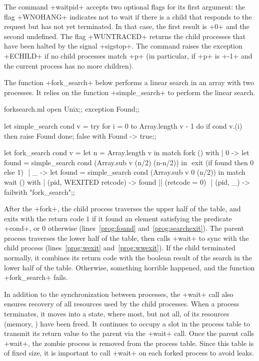 The command \ml+waitpid+ accepts two optional flags for its first
argument: the flag \ml+WNOHANG+ indicates not to wait if there is
a child that responds to the request but has not yet terminated.
In that case, the first result is \ml+0+ and the second undefined.
The flag \ml+WUNTRACED+ returns the child processes that have been
halted by the signal \ml+sigstop+.  The command raises the exception
\ml+ECHILD+ if no child processes match \ml+p+ (in particular, if
\ml+p+ is \ml+-1+ and the current process has no more children).

\begin{example}
\label{ex/forksearch}
The function \ml+fork_search+ below performs a linear search in an 
array with two processes. It relies on the function \ml+simple_search+
to perform the linear search.
%
\begin{listingcodefile}[style=numbers]{forksearch.ml}
open Unix;;
exception Found;;

let simple_search cond v =
 try
   for i = 0 to Array.length v - 1 do
     if cond v.(i) then raise Found
   done;
   false
 with Found -> true;;

let fork_search cond v =
 let n = Array.length v in
 match fork () with
 | 0 ->
     let found = simple_search cond (Array.sub v (n/2) (n-n/2)) in $\label{prog:found}$
     exit (if found then 0 else 1) $\label{prog:searchexit}$
 | _ ->
     let found = simple_search cond (Array.sub v 0 (n/2)) in
     match wait () with
     | (pid, WEXITED retcode) -> found || (retcode = 0) $\label{prog:wexit}$
     | (pid, _)               -> failwith "fork_search";;$\label{prog:wwexit}$
\end{listingcodefile}
%
After the \ml+fork+, the child process traverses the upper half of
the table, and exits with the return code $1$ if it found an element
satisfying the predicate \ml+cond+, or $0$ otherwise
(lines~\ref{prog:found} and~\ref{prog:searchexit}). The parent process
traverses the lower half of the table, then calls \ml+wait+ to
sync with the child process (lines~\ref{prog:wexit}
and~\ref{prog:wwexit}). If the child terminated normally, it combines
its return code with the boolean result of the search in the lower
half of the table. Otherwise, something horrible happened, and the
function \ml+fork_search+ fails.
\end{example}

In addition to the synchronization between processes, the \ml+wait+
call also ensures recovery of all resources used by the child
processes.  When a process terminates, it moves into a 
state, where most, but not all, of its resources (memory, \etc) have
been freed. It continues to occupy a slot in the process table to
transmit its return value to the parent via the \ml+wait+ call.
Once the parent calls \ml+wait+, the zombie process is removed from
the process table. Since this table is of fixed size, it is important
to call \ml+wait+ on each forked process to avoid leaks.

